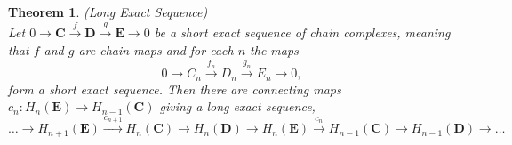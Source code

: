 \documentclass[11.5pt, twoside, a4paper, titlepage]{report}
\theoremstyle{definition}
\theoremstyle{plain}
\newtheorem{thm}[mydef]{Theorem}
\begin{document}
\begin{thm} (Long Exact Sequence) \label{longexactseqthm} \\
Let $0\xrightarrow{}\mathbf{C} \xrightarrow{f} \mathbf{D} \xrightarrow{g} \mathbf{E} \xrightarrow{}0$ be a short exact sequence of chain complexes, meaning that $f$ and $g$ are chain maps and for each $n$ the maps
\begin{equation*}
0 \xrightarrow{} C_n \xrightarrow{f_n} D_n \xrightarrow{g_n} E_n \xrightarrow{} 0,
\end{equation*}
form a short exact sequence. Then there are connecting maps $c_n:H_n(\mathbf{E}) \to H_{n-1}(\mathbf{C})$ giving a long exact sequence, 
\begin{equation*}
\dots \xrightarrow{}H_{n+1}(\mathbf{E}) \xrightarrow{c_{n+1}} H_n(\mathbf{C}) \xrightarrow{} H_n(\mathbf{D})\xrightarrow{}H_n(\mathbf{E}) \xrightarrow{c_n} H_{n-1}(\mathbf{C}) \xrightarrow{} H_{n-1}(\mathbf{D}) \xrightarrow{} \dots
\end{equation*}
\end{thm}
\end{document}
